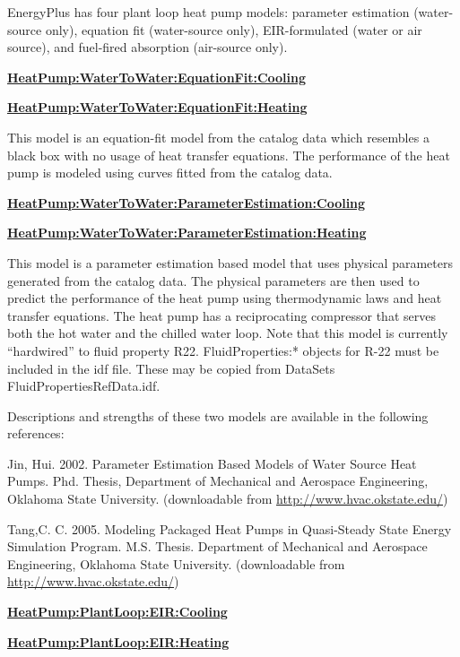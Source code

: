 EnergyPlus has four plant loop heat pump models: parameter estimation (water-source only), equation fit (water-source only), EIR-formulated (water or air source), and fuel-fired absorption (air-source only).

\textbf{\hyperref[heatpumpwatertowaterequationfitcooling]{HeatPump:WaterToWater:EquationFit:Cooling}}

\textbf{\hyperref[heatpumpwatertowaterequationfitheating]{HeatPump:WaterToWater:EquationFit:Heating}}

This model is an equation-fit model from the catalog data which resembles a black box with no usage of heat transfer equations. The performance of the heat pump is modeled using curves fitted from the catalog data.

\textbf{\hyperref[heatpumpwatertowaterparameterestimationcooling]{HeatPump:WaterToWater:ParameterEstimation:Cooling}}

\textbf{\hyperref[heatpumpwatertowaterparameterestimationheating]{HeatPump:WaterToWater:ParameterEstimation:Heating}}

This model is a parameter estimation based model that uses physical parameters generated from the catalog data. The physical parameters are then used to predict the performance of the heat pump using thermodynamic laws and heat transfer equations. The heat pump has a reciprocating compressor that serves both the hot water and the chilled water loop. Note that this model is currently ``hardwired'' to fluid property R22. FluidProperties:* objects for R-22 must be included in the idf file. These may be copied from DataSets\\FluidPropertiesRefData.idf.

Descriptions and strengths of these two models are available in the following references:

Jin, Hui. 2002. Parameter Estimation Based Models of Water Source Heat Pumps. Phd. Thesis, Department of Mechanical and Aerospace Engineering, Oklahoma State University. (downloadable from \href{http://www.hvac.okstate.edu}{http://www.hvac.okstate.edu/})

Tang,C. C. 2005. Modeling Packaged Heat Pumps in Quasi-Steady State Energy Simulation Program. M.S. Thesis. Department of Mechanical and Aerospace Engineering, Oklahoma State University. (downloadable from \href{http://www.hvac.okstate.edu}{http://www.hvac.okstate.edu/})

\textbf{\hyperref[plhp_eir_cooling]{HeatPump:PlantLoop:EIR:Cooling}}

\textbf{\hyperref[plhp_eir_heating]{HeatPump:PlantLoop:EIR:Heating}}

